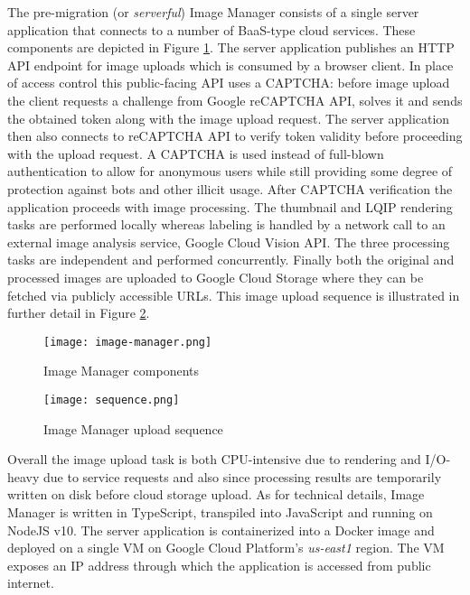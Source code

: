 The pre-migration (or \textit{serverful}) Image Manager consists of a single server application that connects to a number of BaaS-type cloud services. These components are depicted in Figure \ref{fig:serverfulArchitecture}. The server application publishes an HTTP API endpoint for image uploads which is consumed by a browser client. In place of access control this public-facing API uses a CAPTCHA: before image upload the client requests a challenge from Google reCAPTCHA API, solves it and sends the obtained token along with the image upload request. The server application then also connects to reCAPTCHA API to verify token validity before proceeding with the upload request. A CAPTCHA is used instead of full-blown authentication to allow for anonymous users while still providing some degree of protection against bots and other illicit usage. After CAPTCHA verification the application proceeds with image processing. The thumbnail and LQIP rendering tasks are performed locally whereas labeling is handled by a network call to an external image analysis service, Google Cloud Vision API. The three processing tasks are independent and performed concurrently. Finally both the original and processed images are uploaded to Google Cloud Storage where they can be fetched via publicly accessible URLs. This image upload sequence is illustrated in further detail in Figure \ref{fig:serverfulSequence}.

\begin{figure}[H]
  \centering
  \texttt{[image: image-manager.png]}
  \caption{Image Manager components}
  \label{fig:serverfulArchitecture}
\end{figure}

\begin{figure}[H]
  \centering
  \texttt{[image: sequence.png]}
  \caption{Image Manager upload sequence}
  \label{fig:serverfulSequence}
\end{figure}

Overall the image upload task is both CPU-intensive due to rendering and I/O-heavy due to service requests and also since processing results are temporarily written on disk before cloud storage upload. As for technical details, Image Manager is written in TypeScript, transpiled into JavaScript and running on NodeJS v10. The server application is containerized into a Docker image and deployed on a single VM on Google Cloud Platform's \textit{us-east1} region. The VM exposes an IP address through which the application is accessed from public internet.

